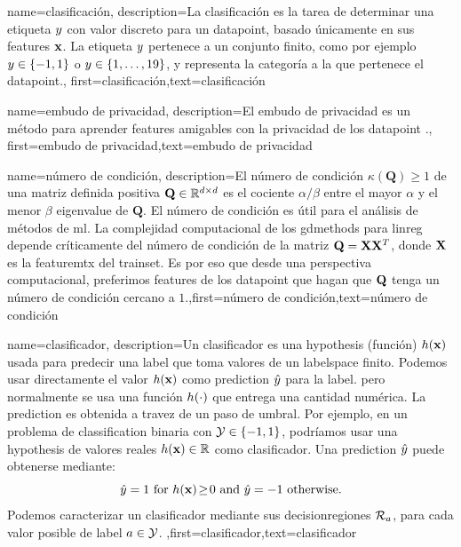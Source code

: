 {name={clasificación},
description={La clasificación es la tarea de determinar una
	etiqueta $y$  con valor discreto para un \gls{datapoint}, basado únicamente en sus 
	 \gls{feature}s ${\bf x}$. La etiqueta $y$ pertenece a un conjunto finito, como por ejemplo 
	$y \in \{-1,1\}$ o $y \in \{1,\ldots,19\}$, y representa la 
	categoría a la que pertenece el \gls{datapoint}.},
	first={clasificación},text={clasificación} 
}


{name={embudo de privacidad},
description={El embudo de privacidad es un método para aprender \gls{feature}s 
	amigables con la privacidad de los \gls{datapoint} \cite{PrivacyFunnel}.},
first={embudo de privacidad},text={embudo de privacidad} 
}




{
	name={número de condición},
	description={El número de condición $\kappa(\mathbf{Q}) \geq 1$ de una 
		matriz definida positiva $\mathbf{Q} \in \mathbb{R}^{d \times d}$ es el cociente 
		$\alpha /\beta  $ entre el 
		mayor $\alpha$ y el menor $\beta$ \gls{eigenvalue} de 
		$\mathbf{Q}$. El número de condición es útil para el análisis de métodos de \gls{ml}. 
		La complejidad computacional de los \gls{gdmethods} para \gls{linreg} depende críticamente del número 
		de condición de la matriz $\mathbf{Q} = {\bf X} {\bf X}^{T}$, donde ${\bf X}$  es la \gls{featuremtx}  
		del \gls{trainset}. Es por eso que desde una perspectiva computacional, preferimos \gls{feature}s de los 
		\gls{datapoint} que hagan que $\mathbf{Q}$ tenga un número de condición cercano a $1$.},first={número de condición},text={número de condición} 
}

{
	name={clasificador},
	description={Un clasificador es una \gls{hypothesis} (función) $h({\bf x})$ 
		usada para predecir una \gls{label} que toma valores de un \gls{labelspace} finito. Podemos usar directamente 
		el valor $h({\bf x})$ como \gls{prediction} $\hat{y}$ para 
		la \gls{label}. pero normalmente se usa una función $h(\cdot)$ que entrega 
		una cantidad numérica. La \gls{prediction} es obtenida a travez de un paso de umbral. 
		Por ejemplo, en un problema de \gls{classification} binaria con \label{labelspace} $\mathcal{Y} \in  \{ -1,1\}$, 
		podríamos usar una \gls{hypothesis} de valores reales $h({\bf x}) \in \mathbb{R}$ 
		como clasificador. Una \gls{prediction} $\hat{y}$ puede obtenerse mediante:  
		 \begin{equation} 
		 	\label{equ_def_threshold_bin_classifier_dict}
		 	\hat{y} =1   \mbox{ for } h({\bf x})\!\geq\!0 \mbox{ and } 	\hat{y} =-1  \mbox{ otherwise.}
	 		\end{equation}
		Podemos caracterizar un clasificador mediante sus \gls{decisionregion}es $\mathcal{R}_{a}$, para 
		cada valor posible de \gls{label} $a \in \mathcal{Y}$. },first={clasificador},text={clasificador} 
}

